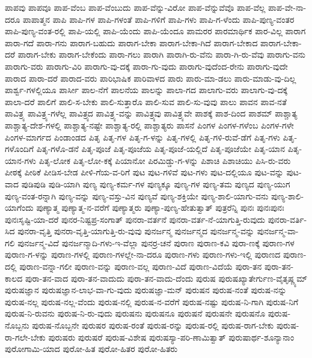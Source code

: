 {ಪಾಪವು
ಪಾಪವೂ
ಪಾಪ-ವೆಂಬ
ಪಾಪ-ವೆಂಬುದು
ಪಾಪ-ವೆನ್ನು-ವಿರೋ
ಪಾಪ-ವೆನ್ನುವೆವೊ
ಪಾಪ-ವೆಲ್ಲ
ಪಾಪ-ವೇ-ನಾ-ದರೂ
ಪಾಪಾತ್ಮನ
ಪಾಪಿ
ಪಾಪಿ-ಗಳ
ಪಾಪಿ-ಗಳಂತೆ
ಪಾಪಿ-ಗಳಿಗೆ
ಪಾಪಿ-ಗಳು
ಪಾಪಿ-ಗ-ಳೆಂದು
ಪಾಪಿ-ಪುಣ್ಯ-ವಂತರ
ಪಾಪಿ-ಪುಣ್ಯ-ವಂತ-ರಲ್ಲಿ
ಪಾಪಿ-ಯಲ್ಲಿ
ಪಾಪಿ-ಯೆಂದು
ಪಾಪಿ-ಯೆಂದೂ
ಪಾಮರರ
ಪಾರಮಾರ್ಥಿಕ
ಪಾರ-ವಿಲ್ಲ
ಪಾರಾಗ
ಪಾರಾ-ಗದೆ
ಪಾರಾ-ಗನು
ಪಾರಾಗ-ಬಹುದು
ಪಾರಾಗ-ಬೇಕಾ
ಪಾರಾಗ-ಬೇಕಾ-ಗಿದೆ
ಪಾರಾಗ-ಬೇಕಾದ
ಪಾರಾಗ-ಬೇಕಾ-ದರೆ
ಪಾರಾಗ-ಬೇಕು
ಪಾರಾಗ-ಬೇಕೆಂದು
ಪಾರಾ-ಗಲು
ಪಾರಾಗಿ
ಪಾರಾಗಿ-ರು-ವೆನು
ಪಾರಾ-ಗಿ-ರು-ವೆವು
ಪಾರಾಗು-ವನು
ಪಾರಾಗು-ವರು
ಪಾರಾಗು-ವಿರಿ
ಪಾರಾಗು-ವು-ದಕ್ಕೆ
ಪಾರಾ-ಗು-ವುದು
ಪಾರಾಗು-ವುದೆಂದ-ರೇನು
ಪಾರಾಗು-ವುದೇ
ಪಾರಾದ
ಪಾರಾ-ದರೆ
ಪಾರಾದ-ವರು
ಪಾರಿಭಾಷಿಕ
ಪಾರಿವಾಳದ
ಪಾರು
ಪಾರು-ಮಾ-ಡಲು
ಪಾರು-ಮಾಡು-ವು-ದಿಲ್ಲ
ಪಾರ್ಶ್ವ-ಗಳಲ್ಲಿಯೂ
ಪಾರ್ಸೀ
ಪಾಲ-ನೆಗೆ
ಪಾಲನೆಯ
ಪಾಲನ್ನು
ಪಾಲಾ-ಗದ
ಪಾಲಾಗು-ವರು
ಪಾಲಾಗು-ವು-ದಕ್ಕೆ
ಪಾಲಾ-ದರೆ
ಪಾಲಿಗೆ
ಪಾಲಿ-ಸ-ಬೇಕು
ಪಾಲಿ-ಸುತ್ತಾರೊ
ಪಾಲಿ-ಸುವ
ಪಾಲಿ-ಸು-ವುವು
ಪಾಲು
ಪಾವನ
ಪಾವ-ನತೆ
ಪಾವಿತ್ರ್ಯ
ಪಾವಿತ್ರ್ಯ-ಗಳೆಲ್ಲ
ಪಾವಿತ್ರ್ಯದ
ಪಾವಿತ್ರ್ಯ-ವನ್ನು
ಪಾವಿತ್ರ್ಯವು
ಪಾವಿತ್ರ್ಯವೇ
ಪಾಶಕ್ಕೆ
ಪಾಶ-ದಿಂದ
ಪಾಶಮ್
ಪಾಶ್ಚಾತ್ಯ
ಪಾಶ್ಚಾತ್ಯ-ದೇಶ-ಗಳಲ್ಲಿ
ಪಾಶ್ಚಾತ್ಯ-ನಷ್ಟೇ
ಪಾಶ್ಚಾತ್ಯ-ರಲ್ಲಿ
ಪಾಶ್ಚಾತ್ಯರು
ಪಾಸನೆ
ಪಿಂಗಳ
ಪಿಂಗಳ-ಗಳೆಂಬ
ಪಿಂಗಳ-ಗಳೇ
ಪಿಂಗಳ-ಮಾರ್ಗದ
ಪಿಂಡಾಂಡದ
ಪಿತೃ
ಪಿತೃ-ಗಳ
ಪಿತೃ-ಗ-ಳನ್ನು
ಪಿತೃ-ಗಳಲ್ಲಿ
ಪಿತೃ-ಗಳಿ-ರುವೆ-ಡೆಗೆ
ಪಿತೃ-ಗಳು
ಪಿತೃ-ಗಳೊಂದಿಗೆ
ಪಿತೃ-ಗಳೊ-ಡನೆ
ಪಿತೃ-ಪೂಜೆ
ಪಿತೃ-ಪೂಜೆಯ
ಪಿತೃ-ಪೂಜೆ-ಯಲ್ಲಿದೆ
ಪಿತೃ-ಪೂಜೆಯೇ
ಪಿತೃ-ಯಾನ
ಪಿತೃ-ಯಾನ-ಗಳು
ಪಿತೃ-ಲೋಕ
ಪಿತೃ-ಲೋ-ಕಕ್ಕೆ
ಪಿಯಾನೋ
ಪಿರಮಿಡ್ಡು-ಗ-ಳನ್ನು
ಪಿಶಾಚಿ
ಪಿಶಾಚಿಯು
ಪಿಸಿ-ರು-ವರು
ಪೀಠಕ್ಕೆ
ಪೀಠಿಕೆ
ಪೀಡಿಸ-ಬೇಡ
ಪೀಳಿ-ಗೆಯ-ವ-ರಿಗೆ
ಪುಟ
ಪುಟ-ಗಳಿವೆ
ಪುಟ-ಗಳು
ಪುಟ-ದಲ್ಲಿಯೂ
ಪುಟ-ವನ್ನು
ಪುಟ-ವಾದ
ಪುಡಿಪುಡಿ
ಪುಡಿ-ಯಾಗಿ
ಪುಣ್ಯ
ಪುಣ್ಯ-ಕರ್ಮ-ಗಳ
ಪುಣ್ಯಕ್ಕೂ
ಪುಣ್ಯ-ಗಳ
ಪುಣ್ಯ-ತಮ
ಪುಣ್ಯದ
ಪುಣ್ಯ-ಯುಗ
ಪುಣ್ಯ-ವಂತ-ರನ್ನಾಗಿ
ಪುಣ್ಯ-ವನ್ನು
ಪುಣ್ಯ-ವಸ್ತು-ವಿನ
ಪುಣ್ಯವೆ
ಪುಣ್ಯ-ಶಕ್ತಿಯೇ
ಪುಣ್ಯ-ಶಾಲಿ-ಯಾಗು-ವನು
ಪುಣ್ಯ-ಶಾಲಿ-ಯಾಗೆಂದು
ಪುಣ್ಯಾತ್ಮ
ಪುಣ್ಯಾತ್ಮ-ನ-ವರೆಗೆ
ಪುಣ್ಯಾತ್ಮರು
ಪುಣ್ಯಾ-ಪುಣ್ಯ-ಹೇತುತ್ವಾತ್
ಪುತ್ರರೆನ್ನಿ
ಪುನಃ
ಪುನಃಪುನಃ
ಪುನಃಸೃಷ್ಟಿ-ಯಾ-ದರೆ
ಪುನರ-ನಿಷ್ಟಪ್ರ-ಸಂಗಾತ್
ಪುನರಾ-ವರ್ತನೆ
ಪುನರಾ-ವರ್ತ-ನೆ-ಯಾಗುತ್ತಿ-ರುವುದು
ಪುನರಾ-ವರ್ತಿ-ಸಿದ
ಪುನರಾ-ವೃತ್ತಿ
ಪುನರಾ-ವೃತ್ತಿ-ಯಾಗುತ್ತಿ-ರು-ವುವು
ಪುನರ್ಜನ್ಮ
ಪುನರ್ಜನ್ಮದ
ಪುನರ್ಜನ್ಮ-ವನ್ನು
ಪುನರ್ಜನ್ಮ-ವಾ-ಗಲಿ
ಪುನರ್ಜನ್ಮ-ವಿದೆ
ಪುನರ್ಜನ್ಮಾದಿ-ಗಳು-ಇ-ವೆಲ್ಲಾ
ಪುನರ್ರ-ಚನೆ
ಪುರಾಣ
ಪುರಾಣ-ಕವಿ
ಪುರಾ-ಣಕ್ಕೆ
ಪುರಾಣ-ಗಳ
ಪುರಾಣ-ಗ-ಳನ್ನು
ಪುರಾಣ-ಗಳಲ್ಲಿ
ಪುರಾಣ-ಗಳಲ್ಲೇ-ನಾ-ದರೂ
ಪುರಾಣ-ಗಳು
ಪುರಾಣ-ಗಳು-ಇಲ್ಲಿ
ಪುರಾಣದ
ಪುರಾಣ-ದಲ್ಲಿ
ಪುರಾಣ-ವನ್ನಾ-ಗಲೀ
ಪುರಾಣ-ವನ್ನು
ಪುರಾಣ-ವಲ್ಲ
ಪುರಾಣ-ವಿದೆ
ಪುರಾಣ-ವಿದೆಯೆ
ಪುರಾ-ತನ
ಪುರಾ-ತನ-ಕಾಲದ
ಪುರಾ-ತನ-ವಾದ
ಪುರಾ-ತನ-ವಾದುದು
ಪುರಾ-ತನ-ವಾದು-ದೆಂದು
ಪುರುಷ
ಪುರುಷಖ್ಯಾತೇರ್ಗುಣ-ವೈತೃಷ್ಣ್ಯಮ್
ಪುರುಷಜ್ಞಾನ
ಪುರುಷಜ್ಞಾನ-ಲಾಭ-ವಾ-ಗು-ವುದು
ಪುರುಷಜ್ಞಾ-ಮನ್
ಪುರುಷನ
ಪುರುಷ-ನಂತೆ
ಪುರುಷ-ನನ್ನು
ಪುರುಷ-ನಲ್ಲ
ಪುರುಷ-ನಲ್ಲ-ವೆಂದು
ಪುರುಷ-ನಲ್ಲಿ
ಪುರುಷ-ನ-ವರೆಗೆ
ಪುರುಷ-ನಷ್ಟು
ಪುರುಷ-ನಿ-ಗಾಗಿ
ಪುರುಷ-ನಿಗೆ
ಪುರುಷ-ನಿ-ರುವನು
ಪುರುಷ-ನಿ-ರು-ವುದು
ಪುರುಷನು
ಪುರುಷನೂ
ಪುರುಷನೆ
ಪುರುಷನೇ
ಪುರುಷನೊ
ಪುರುಷ-ನೊಬ್ಬನು
ಪುರುಷ-ನೊಬ್ಬನೇ
ಪುರುಷರ
ಪುರುಷ-ರಂತೆ
ಪುರುಷ-ರನ್ನು
ಪುರುಷ-ರಲ್ಲಿ
ಪುರುಷ-ರಾಗ-ಬೇಕು
ಪುರುಷ-ರಾ-ಗಲೇ-ಬೇಕು
ಪುರುಷರು
ಪುರುಷರೆ
ಪುರುಷ-ವಿಶೇಷ
ಪುರುಷಸ್ಯಾ-ಪರಿ-ಣಾಮಿತ್ವಾತ್
ಪುರುಷಾರ್ಥ-ಶೂನ್ಯಾನಾಂ
ಪುರೋಗಾಮಿ-ಯಾದ
ಪುರೋ-ಹಿತ
ಪುರೋ-ಹಿತರ
ಪುರೋ-ಹಿತರು
}
